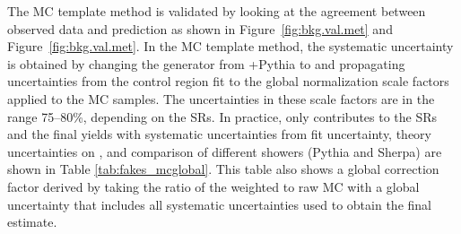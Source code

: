 The MC template method is validated by looking at the agreement 
between observed data and prediction as shown in Figure~\ref{fig:bkg.val.met}
and Figure~\ref{fig:bkg.val.met}.
In the MC template method, the systematic uncertainty is obtained by
changing the generator from \POWHEGBOX+Pythia to \SHERPA and propagating uncertainties from the control region fit to the global
normalization scale factors applied to the MC samples. 
The uncertainties in these scale factors are in the range 75--80\%,
depending on the SRs.
In practice, only \ttbar contributes to the SRs and the final yields with systematic uncertainties from 
fit uncertainty, theory uncertainties on \ttbar, and comparison of different showers (Pythia and Sherpa) are shown in Table \ref{tab:fakes_mcglobal}.
This table also shows a global correction factor derived by taking the ratio of the weighted \ttbar to raw MC \ttbar with
a global uncertainty that includes all systematic uncertainties used to obtain the final estimate. 

\linespread{1.0}
\begin{table}[!htb]
\caption{Expected yields for background processes with fake leptons,
in the signal regions with a global correction factor that represents the ratio of weighted \ttbar to raw MC \ttbar with
a global uncertainty that includes: fit uncertainty, theory uncertainties on \ttbar, comparison of different showers. 
The fraction of the systematic uncertainty from the comparison between two showers (Pythia and Sherpa) is also shown.
}
\label{tab:fakes_mcglobal}
\centering
{}
\end{table}
\linespread{1.6}
